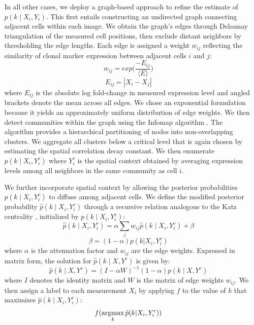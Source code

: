 In all other cases, we deploy a graph-based approach to refine the estimate of $p(k \mid X_i,Y_i)$. This first entails constructing an undirected graph connecting adjacent cells within each image. We obtain the graph's edges through Delaunay triangulation of the measured cell positions, then exclude distant neighbors by thresholding the edge lengths. Each edge is assigned a weight $w_{ij}$ reflecting the similarity of clonal marker expression between adjacent cells $i$ and $j$:
\begin{equation}
w_{ij} = exp \big( \frac{-E_{ij}}{\langle E \rangle} \big)
\end{equation}
\begin{equation}
E_{ij} = | X_i - X_j | 
\end{equation}
where $E_{ij}$ is the absolute log fold-change in measured expression level and angled brackets denote the mean across all edges. We chose an exponential formulation because it yields an approximately uniform distribution of edge weights. We then detect communities within the graph using the Infomap algorithm \cite{Rosvall2009}. The algorithm provides a hierarchical partitioning of nodes into non-overlapping clusters. We aggregate all clusters below a critical level that is again chosen by estimating the spatial correlation decay constant. We then enumerate $p(k \mid X_i,Y_i^c)$ where $Y_i^c$ is the spatial context obtained by averaging expression levels among all neighbors in the same community as cell $i$.

We further incorporate spatial context by allowing the posterior probabilities $p(k \mid X_i,Y_i^c)$ to diffuse among adjacent cells. We define the modified posterior probability $\hat{p}(k \mid X_i,Y_i^c)$ through a recursive relation analogous to the Katz centrality \cite{Katz1953}, initialized by $p(k \mid X_i,Y_i^c)$:
\begin{equation}
\hat{p}(k \mid X_i, Y^c_i) = \alpha \sum_{j}{w_{ij} \hat{p}(k \mid X_i, Y^c _i)} + \beta
\end{equation}
\begin{equation}
\beta = (1-\alpha) p(k| X_i,Y^c_i)
\end{equation}
where $\alpha$ is the attenuation factor and $w_{ij}$ are the edge weights. Expressed in matrix form, the solution for $\hat{p}(k \mid X,Y^c)$ is given by:
\begin{equation}
\hat{p}(k \mid X,Y^c) = ( I - \alpha W )^{-1} (1-\alpha)p(k \mid X, Y^c)
\end{equation}
where $I$ denotes the identity matrix and $W$ is the matrix of edge weights $w_{ij}$. We then assign a label to each measurement $X_i$ by applying $f$ to the value of $k$ that maximizes $\hat{p}(k \mid X_i,Y_i^c)$:
\begin{equation}
f(\operatorname*{\arg\!\max}_{k} \hat{p}(k | X_i, Y^c_i))
\end{equation}

